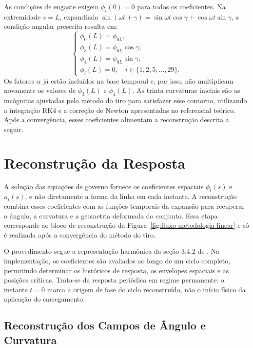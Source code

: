 \documentclass[arial,centeredequations,english,brazilian,oneside,section=TITLE]{ifes8}
\begin{document}
As condições de engaste exigem $\phi_i(0)=0$ para todos os coeficientes.
Na extremidade $s=L$, expandindo
$\sin(\omega t+\gamma)=\sin\omega t\cos\gamma+\cos\omega t\sin\gamma$,
a condição angular prescrita resulta em:
\begin{equation}
  \begin{cases}
    \phi_0(L)=\phi_{0L},\\
    \phi_3(L)=\phi_{0L}\cos\gamma,\\
    \phi_4(L)=\phi_{0L}\sin\gamma,\\
    \phi_i(L)=0,\quad i\in\{1,2,5,\ldots,29\}.
  \end{cases}
  \label{eq:contorno-coeficientes-lineares}
\end{equation}
Os fatores $\alpha$ já estão incluídos na base temporal e, por isso, não
multiplicam novamente os valores de $\phi_3(L)$ e $\phi_4(L)$. As trinta
curvaturas iniciais são as incógnitas ajustadas pelo método do tiro para
satisfazer esse contorno, utilizando a integração RK4 e a correção de Newton
apresentadas no referencial teórico. Após a convergência, esses coeficientes
alimentam a reconstrução descrita a seguir.

\section{Reconstrução da Resposta}
\label{sec:reconstrucao-da-resposta}

A solução das equações de governo fornece os coeficientes espaciais
$\phi_i(s)$ e $\kappa_i(s)$, e não diretamente a forma da linha em cada
instante. A reconstrução combina esses coeficientes com as funções temporais
da expansão para recuperar o ângulo, a curvatura e a geometria deformada do
conjunto. Essa etapa corresponde ao bloco de reconstrução da
Figura~\ref{fig:fluxo-metodologia-linear} e só é realizada após a convergência
do método do tiro.

O procedimento segue a representação harmônica da seção 3.4.2 de
. Na implementação, os coeficientes são avaliados ao
longo de um ciclo completo, permitindo determinar os históricos de resposta,
os envelopes espaciais e as posições críticas. Trata-se da resposta periódica
em regime permanente: o instante $t=0$ marca a origem de fase do ciclo
reconstruído, não o início físico da aplicação do carregamento.

\subsection{Reconstrução dos Campos de Ângulo e Curvatura}
\label{sec:reconstrucao-campos-lineares}
\end{document}
